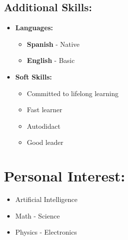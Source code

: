 \documentclass{article}
\begin{document}
\begin{minipage}[t]{8cm}
\begin{itemize}
  
\end{itemize}

\subsection*{Additional Skills:}
\begin{itemize}
  \setlength\itemsep{0.01cm}
\item \textbf{Languages:}
  \begin{itemize}[label = {-}]
  \setlength\itemsep{0.01cm}
  \item \textbf{Spanish} - Native
  \item \textbf{English} - Basic 
  \end{itemize}
\item \textbf{Soft Skills:}
  \begin{itemize}[label = {-}]
  \setlength\itemsep{0.01cm}
  \item Committed to lifelong learning 
  \item Fast learner
  \item Autodidact
  \item Good leader
  \end{itemize}
\end{itemize}

\section*{Personal Interest:}
\begin{itemize}
\item Artificial Intelligence
\item Math - Science
\item Physics - Electronics
\end{itemize}

\end{minipage}
\space
\space
\space
\space
\space
\end{document}
